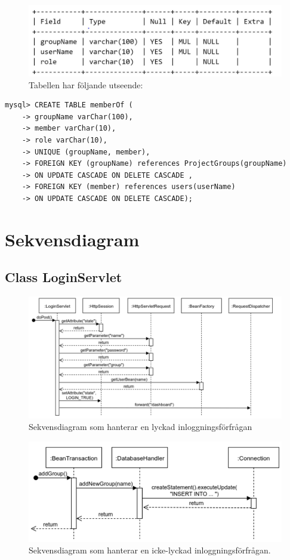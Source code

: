 \documentclass[paper=a4, fontsize=11pt,twoside]{article}
\begin{document}
\begin{figure}[H]
\centering
\caption{Tabellen har följande utseende:}
\includegraphics{memberOfTable}
\end{figure}

\begin{lstlisting}[frame=single, caption={Tabellen kan konstrueras med följande SQL-satser:}]
mysql> CREATE TABLE memberOf (
    -> groupName varChar(100),
    -> member varChar(10),
    -> role varChar(10),
    -> UNIQUE (groupName, member),
    -> FOREIGN KEY (groupName) references ProjectGroups(groupName) 
    -> ON UPDATE CASCADE ON DELETE CASCADE ,
    -> FOREIGN KEY (member) references users(userName) 
    -> ON UPDATE CASCADE ON DELETE CASCADE);
\end{lstlisting}



\section{Sekvensdiagram}
\subsection{Class LoginServlet}
\begin{figure}[H]
\centering
\includegraphics[width=175mm]{LoginServlet}
\caption{Sekvensdiagram som hanterar en lyckad inloggningsförfrågan}
\end{figure}

\begin{figure}[H]
\centering
\includegraphics[width=170mm]{LoginServletFailed}
\caption{Sekvensdiagram som hanterar en icke-lyckad inloggningsförfrågan.}
\end{figure}
\end{document}
